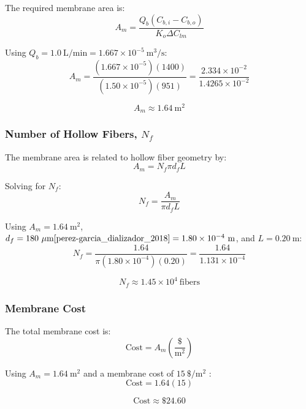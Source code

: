 \documentclass[10.5pt]{article}
\begin{document}
The required membrane area is:
\[
    A_m =
    \frac{Q_b(C_{b,i}-C_{b,o})}
    {K_o \Delta C_{lm}}
\]

Using $Q_b=1.0 \ \text{L/min}=1.667 \times 10^{-5} \ \text{m}^3/\text{s}$:
\[
    A_m
    =
    \frac{(1.667 \times 10^{-5})(1400)}
    {(1.50 \times 10^{-5})(951)}
    =
    \frac{2.334 \times 10^{-2}}
    {1.4265 \times 10^{-2}}
\]

\[
    \boxed{A_m \approx 1.64 \ \text{m}^2}
\]

\subsubsection{Number of Hollow Fibers, $N_f$}

The membrane area is related to hollow fiber geometry by:
\[
    A_m = N_f \pi d_f L
\]

Solving for $N_f$:
\[
    N_f = \frac{A_m}{\pi d_f L}
\]

Using $A_m=1.64 \ \text{m}^2$, $d_f=180 \ \mu\text{m} \cite{perez-garcia_dializador_2018} = 1.80 \times 10^{-4} \ \text{m}$, and $L=0.20 \ \text{m}$:
\[
    N_f
    =
    \frac{1.64}
    {\pi(1.80 \times 10^{-4})(0.20)}
    =
    \frac{1.64}{1.131 \times 10^{-4}}
\]

\[
    \boxed{N_f \approx 1.45 \times 10^4 \ \text{fibers}}
\]

\subsubsection{Membrane Cost}

The total membrane cost is:
\[
    \text{Cost}
    =
    A_m \left(\frac{\$}{\text{m}^2}\right)
\]

Using $A_m=1.64 \ \text{m}^2$ and a membrane cost of $15 \ \$/\text{m}^2$ \cite{yehl_single-use_2020}:
\[
    \text{Cost} = 1.64(15)
\]

\[
    \boxed{\text{Cost} \approx \$24.60}
\]
\end{document}
